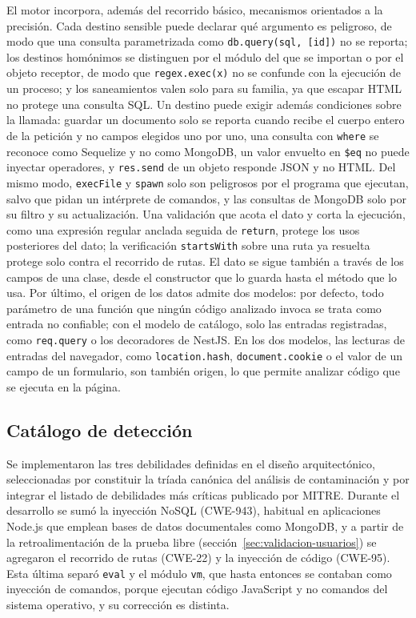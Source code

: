 El motor incorpora, además del recorrido básico, mecanismos orientados a la precisión. Cada destino sensible puede declarar qué argumento es peligroso, de modo que una consulta parametrizada como \texttt{db.query(sql, [id])} no se reporta; los destinos homónimos se distinguen por el módulo del que se importan o por el objeto receptor, de modo que \texttt{regex.exec(x)} no se confunde con la ejecución de un proceso; y los saneamientos valen solo para su familia, ya que escapar HTML no protege una consulta SQL. Un destino puede exigir además condiciones sobre la llamada: guardar un documento solo se reporta cuando recibe el cuerpo entero de la petición y no campos elegidos uno por uno, una consulta con \texttt{where} se reconoce como Sequelize y no como MongoDB, un valor envuelto en \texttt{\$eq} no puede inyectar operadores, y \texttt{res.send} de un objeto responde JSON y no HTML. Del mismo modo, \texttt{execFile} y \texttt{spawn} solo son peligrosos por el programa que ejecutan, salvo que pidan un intérprete de comandos, y las consultas de MongoDB solo por su filtro y su actualización. Una validación que acota el dato y corta la ejecución, como una expresión regular anclada seguida de \texttt{return}, protege los usos posteriores del dato; la verificación \texttt{startsWith} sobre una ruta ya resuelta protege solo contra el recorrido de rutas. El dato se sigue también a través de los campos de una clase, desde el constructor que lo guarda hasta el método que lo usa. Por último, el origen de los datos admite dos modelos: por defecto, todo parámetro de una función que ningún código analizado invoca se trata como entrada no confiable; con el modelo de catálogo, solo las entradas registradas, como \texttt{req.query} o los decoradores de NestJS. En los dos modelos, las lecturas de entradas del navegador, como \texttt{location.hash}, \texttt{document.cookie} o el valor de un campo de un formulario, son también origen, lo que permite analizar código que se ejecuta en la página.

\subsection{Catálogo de detección}\label{sec:n4.2.3}

Se implementaron las tres debilidades definidas en el diseño arquitectónico, seleccionadas por constituir la tríada canónica del análisis de contaminación y por integrar el listado de debilidades más críticas publicado por MITRE. Durante el desarrollo se sumó la inyección NoSQL (CWE-943), habitual en aplicaciones Node.js que emplean bases de datos documentales como MongoDB, y a partir de la retroalimentación de la prueba libre (sección~\ref{sec:validacion-usuarios}) se agregaron el recorrido de rutas (CWE-22) y la inyección de código (CWE-95). Esta última separó \texttt{eval} y el módulo \texttt{vm}, que hasta entonces se contaban como inyección de comandos, porque ejecutan código JavaScript y no comandos del sistema operativo, y su corrección es distinta.

